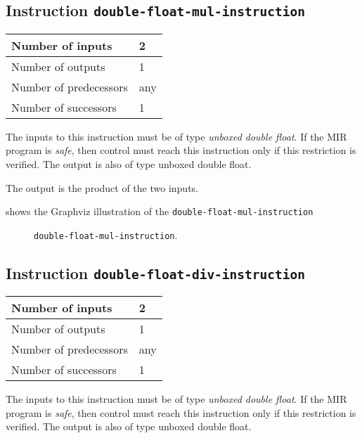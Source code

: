 \subsection{Instruction \texttt{double-float-mul-instruction}}
\label{mir-instruction-double-float-mul}

\begin{tabular}{|l|l|}
\hline
Number of inputs & 2\\
\hline
Number of outputs & 1\\
\hline
Number of predecessors & any\\
\hline
Number of successors & 1\\
\hline
\end{tabular}

The inputs to this instruction must be of type \emph{unboxed double
  float}.  If the MIR program is \emph{safe}, then control must reach
this instruction only if this restriction is verified.  The output is
also of type unboxed double float.

The output is the product of the two inputs.

 shows the Graphviz illustration of the
\texttt{double-float-mul-instruction}

\begin{figure}
\begin{center}
\end{center}
\caption{\label{fig-double-float-mul-instruction}
\texttt{double-float-mul-instruction}.}
\end{figure}

\subsection{Instruction \texttt{double-float-div-instruction}}
\label{mir-instruction-double-float-div}

\begin{tabular}{|l|l|}
\hline
Number of inputs & 2\\
\hline
Number of outputs & 1\\
\hline
Number of predecessors & any\\
\hline
Number of successors & 1\\
\hline
\end{tabular}

The inputs to this instruction must be of type \emph{unboxed double
  float}.  If the MIR program is \emph{safe}, then control must reach
this instruction only if this restriction is verified.  The output is
also of type unboxed double float.

